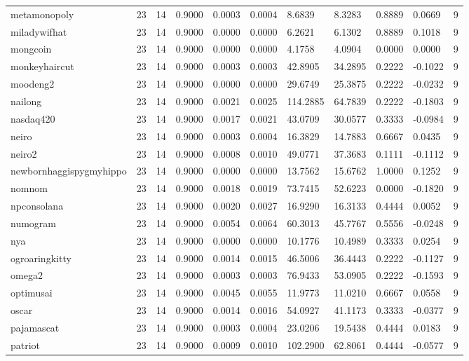 \begin{table}[htbp]
\begin{tabular}{lllllllllll}
metamonopoly & 23 & 14 & 0.9000 & 0.0003 & 0.0004 & 8.6839 & 8.3283 & 0.8889 & 0.0669 & 9 \\
miladywifhat & 23 & 14 & 0.9000 & 0.0000 & 0.0000 & 6.2621 & 6.1302 & 0.8889 & 0.1018 & 9 \\
mongcoin & 23 & 14 & 0.9000 & 0.0000 & 0.0000 & 4.1758 & 4.0904 & 0.0000 & 0.0000 & 9 \\
monkeyhaircut & 23 & 14 & 0.9000 & 0.0003 & 0.0003 & 42.8905 & 34.2895 & 0.2222 & -0.1022 & 9 \\
moodeng2 & 23 & 14 & 0.9000 & 0.0000 & 0.0000 & 29.6749 & 25.3875 & 0.2222 & -0.0232 & 9 \\
nailong & 23 & 14 & 0.9000 & 0.0021 & 0.0025 & 114.2885 & 64.7839 & 0.2222 & -0.1803 & 9 \\
nasdaq420 & 23 & 14 & 0.9000 & 0.0017 & 0.0021 & 43.0709 & 30.0577 & 0.3333 & -0.0984 & 9 \\
neiro & 23 & 14 & 0.9000 & 0.0003 & 0.0004 & 16.3829 & 14.7883 & 0.6667 & 0.0435 & 9 \\
neiro2 & 23 & 14 & 0.9000 & 0.0008 & 0.0010 & 49.0771 & 37.3683 & 0.1111 & -0.1112 & 9 \\
newbornhaggispygmyhippo & 23 & 14 & 0.9000 & 0.0000 & 0.0000 & 13.7562 & 15.6762 & 1.0000 & 0.1252 & 9 \\
nomnom & 23 & 14 & 0.9000 & 0.0018 & 0.0019 & 73.7415 & 52.6223 & 0.0000 & -0.1820 & 9 \\
npconsolana & 23 & 14 & 0.9000 & 0.0020 & 0.0027 & 16.9290 & 16.3133 & 0.4444 & 0.0052 & 9 \\
numogram & 23 & 14 & 0.9000 & 0.0054 & 0.0064 & 60.3013 & 45.7767 & 0.5556 & -0.0248 & 9 \\
nya & 23 & 14 & 0.9000 & 0.0000 & 0.0000 & 10.1776 & 10.4989 & 0.3333 & 0.0254 & 9 \\
ogroaringkitty & 23 & 14 & 0.9000 & 0.0014 & 0.0015 & 46.5006 & 36.4443 & 0.2222 & -0.1127 & 9 \\
omega2 & 23 & 14 & 0.9000 & 0.0003 & 0.0003 & 76.9433 & 53.0905 & 0.2222 & -0.1593 & 9 \\
optimusai & 23 & 14 & 0.9000 & 0.0045 & 0.0055 & 11.9773 & 11.0210 & 0.6667 & 0.0558 & 9 \\
oscar & 23 & 14 & 0.9000 & 0.0014 & 0.0016 & 54.0927 & 41.1173 & 0.3333 & -0.0377 & 9 \\
pajamascat & 23 & 14 & 0.9000 & 0.0003 & 0.0004 & 23.0206 & 19.5438 & 0.4444 & 0.0183 & 9 \\
patriot & 23 & 14 & 0.9000 & 0.0009 & 0.0010 & 102.2900 & 62.8061 & 0.4444 & -0.0577 & 9 \\

\end{tabular}
\end{table}
